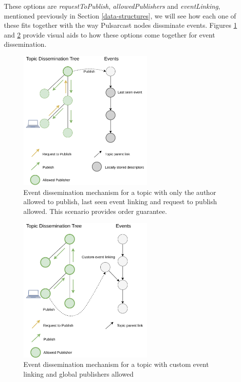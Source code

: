 These options are \emph{requestToPublish}, \emph{allowedPublishers} and
\emph{eventLinking}, mentioned previously in Section \ref{data-structures},
we will see how each one of these fits together with the way Pulsarcast nodes
dissminate events. Figures \ref{fig:pulsarcast-publish-order-guarantee} and
\ref{fig:pulsarcast-publish-custom} provide visual aids to how these options
come together for event dissemination.

\begin{figure}[hb!]
  \centering
  \includegraphics[width=0.6\textwidth]{../images/pulsarcast-publish-order-guarantee.png}
  \caption{Event dissemination mechanism for a topic with only the author allowed to publish, last seen event linking and request to publish allowed. This scenario provides order guarantee.}
  \label{fig:pulsarcast-publish-order-guarantee}
\end{figure}

\begin{figure}[hb!]
  \centering
  \includegraphics[width=0.6\textwidth]{../images/pulsarcast-publish-custom.png}
  \caption{Event dissemination mechanism for a topic with custom event linking and global publishers allowed}
  \label{fig:pulsarcast-publish-custom}
\end{figure}

